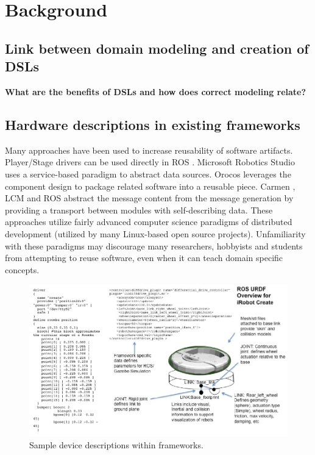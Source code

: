 
\section{Background}\label{sec:rw}

\subsection{Link between domain modeling and creation of DSLs}
{\bf What are the benefits of DSLs and how does correct modeling relate?}

\subsection{Hardware descriptions in existing frameworks}
Many approaches have been used to increase reusability of software artifacts.  Player/Stage drivers can be used directly in ROS \cite{quigley2009}.  Microsoft Robotics Studio uses a service-based paradigm to abstract data sources.  Orocos \cite{Bruyninckx2001} leverages the component design to package related software into a reusable piece.  Carmen \cite{Montemerlo2003}, LCM \cite{Huang2009} and ROS \cite{quigley2009} abstract the message content from the message generation by providing a transport between modules with self-describing data.  These approaches utilize fairly advanced computer science paradigms of distributed development (utilized by many Linux-based open source projects).  Unfamiliarity with these paradigms may discourage many researchers, hobbyists and students from attempting to reuse software, even when it can teach domain specific concepts.

\begin{figure}[thpb]
      \centering
      \includegraphics[width=5in]{URDFPS.pdf}
      \caption{Sample device descriptions within frameworks.}
      \label{psurdf}
\end{figure}

